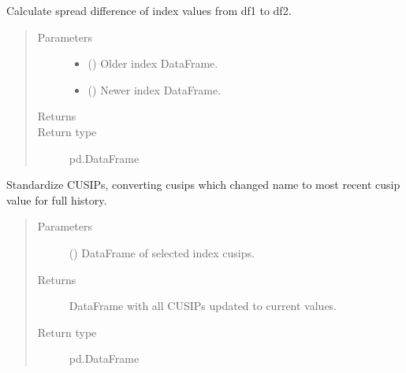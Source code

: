 \documentclass[letterpaper,10pt,english]{report}
\begin{document}
\begin{fulllineitems}
\label{\detokenize{index:lgimapy.index.spread_diff}}
Calculate spread difference of index values from df1 to df2.
\begin{quote}\begin{description}
\item[{Parameters}] \leavevmode\begin{itemize}
\item {} 
 () \textendash{} Older index DataFrame.

\item {} 
 () \textendash{} Newer index DataFrame.

\end{itemize}

\item[{Returns}] \leavevmode
{}

\item[{Return type}] \leavevmode
pd.DataFrame

\end{description}\end{quote}

\end{fulllineitems}


\begin{fulllineitems}
\label{\detokenize{index:lgimapy.index.standardize_cusips}}
Standardize CUSIPs, converting cusips which changed name
to most recent cusip value for full history.
\begin{quote}\begin{description}
\item[{Parameters}] \leavevmode
{} () \textendash{} DataFrame of selected index cusips.

\item[{Returns}] \leavevmode
{} \textendash{} DataFrame with all CUSIPs updated to current values.

\item[{Return type}] \leavevmode
pd.DataFrame

\end{description}\end{quote}

\end{fulllineitems}
\end{document}
